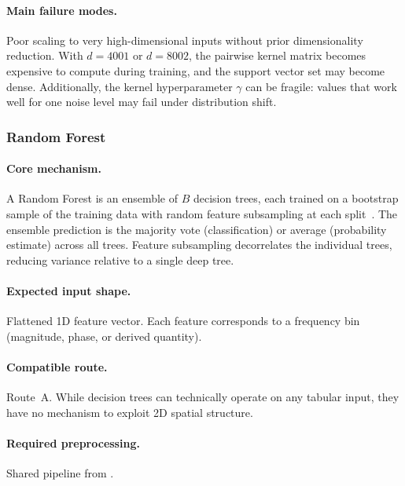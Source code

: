 \paragraph{Main failure modes.}
Poor scaling to very high-dimensional inputs without prior
dimensionality reduction.  With $d = 4001$ or $d = 8002$, the pairwise
kernel matrix becomes expensive to compute during training, and the
support vector set may become dense.  Additionally, the kernel
hyperparameter $\gamma$ can be fragile: values that work well for one
noise level may fail under distribution shift.


\subsubsection{Random Forest}\label{subsec:rf}

\paragraph{Core mechanism.}
A Random Forest is an ensemble of $B$ decision trees, each trained on
a bootstrap sample of the training data with random feature subsampling
at each split~\cite{breiman2001rf}.  The ensemble prediction is the
majority vote (classification) or average (probability estimate) across
all trees.  Feature subsampling decorrelates the individual trees,
reducing variance relative to a single deep tree.

\paragraph{Expected input shape.}
Flattened 1D feature vector.  Each feature corresponds to a frequency
bin (magnitude, phase, or derived quantity).

\paragraph{Compatible route.}
Route~A.  While decision trees can technically operate on any tabular
input, they have no mechanism to exploit 2D spatial structure.

\paragraph{Required preprocessing.}
Shared pipeline from .

